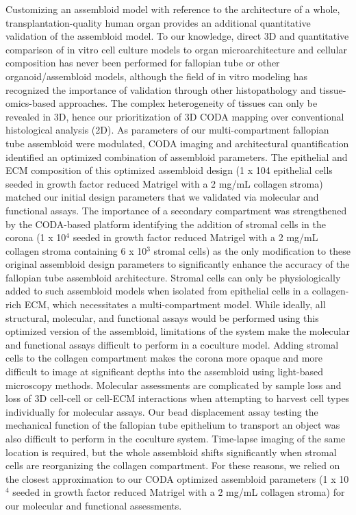\begin{refsection}
    Customizing an assembloid model with reference to the architecture of a whole, transplantation-quality human organ provides an additional quantitative validation of the assembloid model. To our knowledge, direct 3D and quantitative comparison of in vitro cell culture models to organ microarchitecture and cellular composition has never been performed for fallopian tube or other organoid/assembloid models, although the field of in vitro modeling has recognized the importance of validation through other histopathology and tissue-omics-based approaches\cite{garcia-alonso2021a,camp2018a,zhao2022a}. The complex heterogeneity of tissues can only be revealed in 3D\cite{kiemen2022a,Forjaz2025Three}, hence our prioritization of 3D CODA mapping over conventional histological analysis (2D).
    As parameters of our multi-compartment fallopian tube assembloid were modulated, CODA imaging and architectural quantification identified an optimized combination of assembloid parameters. The epithelial and ECM composition of this optimized assembloid design (1 x 104 epithelial cells seeded in growth factor reduced Matrigel with a 2 mg/mL collagen stroma) matched our initial design parameters that we validated via molecular and functional assays. The importance of a secondary compartment was strengthened by the CODA-based platform identifying the addition of stromal cells in the corona (1 x 10$^4$ seeded in growth factor reduced Matrigel with a 2 mg/mL collagen stroma containing 6 x 10$^3$ stromal cells) as the only modification to these original assembloid design parameters to significantly enhance the accuracy of the fallopian tube assembloid architecture. Stromal cells can only be physiologically added to such assembloid models when isolated from epithelial cells in a collagen-rich ECM, which necessitates a multi-compartment model. While ideally, all structural, molecular, and functional assays would be performed using this optimized version of the assembloid, limitations of the system make the molecular and functional assays difficult to perform in a coculture model. Adding stromal cells to the collagen compartment makes the corona more opaque and more difficult to image at significant depths into the assembloid using light-based microscopy methods. Molecular assessments are complicated by sample loss and loss of 3D cell-cell or cell-ECM interactions when attempting to harvest cell types individually for molecular assays. Our bead displacement assay testing the mechanical function of the fallopian tube epithelium to transport an object was also difficult to perform in the coculture system. Time-lapse imaging of the same location is required, but the whole assembloid shifts significantly when stromal cells are reorganizing the collagen compartment. For these reasons, we relied on the closest approximation to our CODA optimized assembloid parameters (1 x 10$^4$ seeded in growth factor reduced Matrigel with a 2 mg/mL collagen stroma) for our molecular and functional assessments.

\end{refsection}
